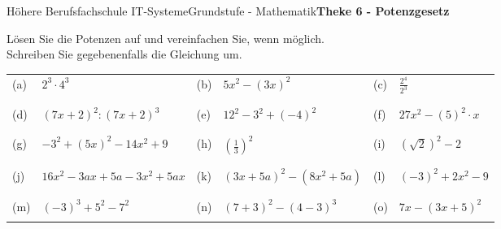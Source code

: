 \documentclass[oneside,openany,headings=optiontotoc,11pt,numbers=noenddot]{scrreprt}
\begin{document}
	\begin{worksheet}{Höhere Berufsfachschule IT-Systeme}{Grundstufe - Mathematik}{\textbf{Theke 6 - Potenzgesetz}}
		\begin{framed}
			\noindent
			Lösen Sie die Potenzen auf und vereinfachen Sie, wenn möglich.\\
			Schreiben Sie gegebenenfalls die Gleichung um.\\
			\begin{tabularx}{\textwidth}{lXlXlX}
				\\
				(a) & \(2^3\cdot{}4^3\) & (b) & \(5x^2-(3x)^2\) & (c) & \(\frac{2^4}{2^3}\)\\
				\\
				\hline
				\\
				(d) & \((7x+2)^2:(7x+2)^3\) & (e) & \(12^2 -3^2+(-4)^2\) & (f) & \(27x^2 - (5)^2\cdot{}x\)\\
				\\
				\hline
				\\
				(g) & \(-3^2 + (5x)^2 -14x^2 + 9\) & (h) & \((\frac{1}{3})^2\) & (i) & \((\sqrt{2})^2 - 2\)\\
				\\
				\hline
				\\
				(j) & \(16x^2 - 3ax +5a - 3x^2 +5ax\) & (k) & \((3x+5a)^2 - (8x^2+5a)\) & (l) & \((-3)^2 + 2x^2 - 9\)\\
				\\
				\hline
				\\
				(m) & \((-3)^3 + 5^2 - 7^2\) & (n) & \((7+3)^2 - (4-3)^3\) & (o) & \(7x - (3x + 5)^2\)\\
				\\
				\hline
			\end{tabularx}
		\end{framed}
	\end{worksheet}
\end{document}
